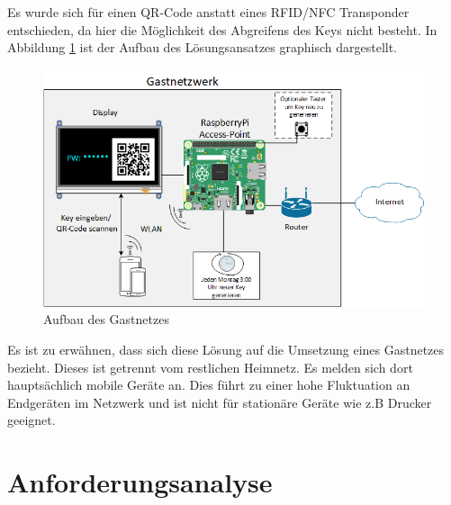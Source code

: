 \documentclass[a4paper,11pt,singlespacing]{article}
\begin{document}
	Es wurde sich für einen QR-Code anstatt eines RFID/NFC Transponder entschieden, da hier die Möglichkeit des Abgreifens des Keys nicht besteht. In Abbildung  \ref{aufbau} ist der Aufbau des Lösungsansatzes graphisch dargestellt. 

	\begin{figure}[ht]
		\centering
		\includegraphics[scale=0.6]{skizze}
			\caption{Aufbau des Gastnetzes}
			\label{aufbau}
	\end{figure}

    Es ist zu erwähnen, dass sich diese Lösung auf die Umsetzung eines Gastnetzes bezieht. Dieses ist getrennt vom restlichen Heimnetz. Es melden sich dort hauptsächlich mobile Geräte an. Dies führt zu einer hohe Fluktuation an Endgeräten im Netzwerk und ist nicht für stationäre Geräte wie z.B Drucker geeignet.
	
	\section{Anforderungsanalyse}
\end{document}
